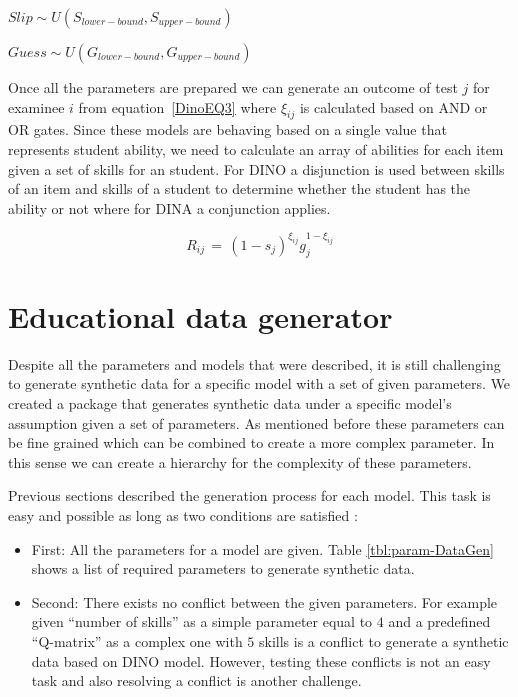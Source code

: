 \begin{center}
$Slip \sim \textit{U}(S_{lower-bound}, S_{upper-bound})$

$Guess \sim \textit{U}(G_{lower-bound}, G_{upper-bound})$
\end{center}

Once all the parameters are prepared we can generate an outcome of test $j$ for examinee $i$ from equation~\ref{DinoEQ3} where $\xi_{ij}$ is calculated based on AND or OR gates. Since these models are behaving based on a single value that represents student ability, we need to calculate an array of abilities for each item given a set of skills for an student. For DINO a disjunction is used between skills of an item and skills of a student to determine whether the student has the ability or not where for DINA a conjunction applies.

\begin{equation}
 R_{ij} \,=\, (1-s_j)^{\xi_{ij}} g_j^{1-\xi_{ij}}
\label{DinoEQ3}
\end{equation}

\section{Educational data generator}

Despite all the parameters and models that were described, it is still challenging to generate synthetic data for a specific model with a set of given parameters. We \citep{Trieu2015} created a package that generates synthetic data under a specific model's assumption given a set of parameters. As mentioned before these parameters can be fine grained which can be combined to create a more complex parameter. In this sense we can create a hierarchy for the complexity of these parameters. 

Previous sections described the generation process for each model. This task is easy and possible as long as two conditions are satisfied : 
\begin{itemize}
\item First: All the parameters for a model are given. Table \ref{tbl:param-DataGen} shows a list of required parameters to generate synthetic data.
\item Second: There exists no conflict between the given parameters. For example given ``number of skills'' as a simple parameter equal to $4$ and a predefined ``Q-matrix'' as a complex one with $5$ skills is a conflict to generate a synthetic data based on DINO model. However, testing these conflicts is not an easy task and also resolving a conflict is another challenge.
\end{itemize} 

